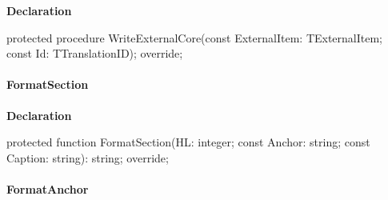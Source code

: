 \documentclass{report}
\newif\ifpdf
\begin{document}
\label{PasDoc_GenSimpleXML.TSimpleXMLDocGenerator-WriteExternalCore}
\begin{list}{}{
\setlength{\itemindent}{0cm}
\setlength{\listparindent}{0cm}
\setlength{\leftmargin}{\evensidemargin}
\addtolength{\leftmargin}{\tmplength}
\settowidth{\labelsep}{X}
\addtolength{\leftmargin}{\labelsep}
\setlength{\labelwidth}{\tmplength}
}
\item[\textbf{Declaration}\hfill]
\ifpdf
\begin{flushleft}
\fi
\begin{ttfamily}
protected procedure WriteExternalCore(const ExternalItem: TExternalItem; const Id: TTranslationID); override;\end{ttfamily}

\ifpdf
\end{flushleft}
\fi

\end{list}
\paragraph*{FormatSection}\hspace*{\fill}

\label{PasDoc_GenSimpleXML.TSimpleXMLDocGenerator-FormatSection}
\begin{list}{}{
\setlength{\itemindent}{0cm}
\setlength{\listparindent}{0cm}
\setlength{\leftmargin}{\evensidemargin}
\addtolength{\leftmargin}{\tmplength}
\settowidth{\labelsep}{X}
\addtolength{\leftmargin}{\labelsep}
\setlength{\labelwidth}{\tmplength}
}
\item[\textbf{Declaration}\hfill]
\ifpdf
\begin{flushleft}
\fi
\begin{ttfamily}
protected function FormatSection(HL: integer; const Anchor: string; const Caption: string): string; override;\end{ttfamily}

\ifpdf
\end{flushleft}
\fi

\end{list}
\paragraph*{FormatAnchor}\hspace*{\fill}
\end{document}
